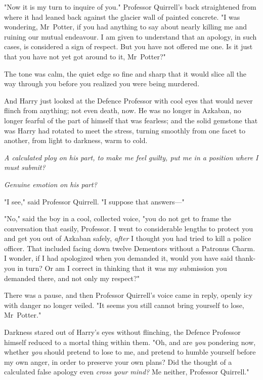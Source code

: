 "Now it is my turn to inquire of you." Professor Quirrell's back straightened
from where it had leaned back against the glacier wall of painted concrete. "I
was wondering, Mr~Potter, if you had anything to say about nearly killing me
and ruining our mutual endeavour. I am given to understand that an apology, in
such cases, is considered a sign of respect. But you have not offered me one.
Is it just that you have not yet got around to it, Mr~Potter?"

The tone was calm, the quiet edge so fine and sharp that it would slice all the
way through you before you realized you were being murdered.

And Harry just looked at the Defence Professor with cool eyes that would never
flinch from anything; not even death, now. He was no longer in Azkaban, no
longer fearful of the part of himself that was fearless; and the solid gemstone
that was Harry had rotated to meet the stress, turning smoothly from one facet
to another, from light to darkness, warm to cold.

\emph{A calculated ploy on his part, to make me feel guilty, put me in a
position where I must submit?}

\emph{Genuine emotion on his part?}

"I see," said Professor Quirrell. "I suppose that answers—"

"No," said the boy in a cool, collected voice, "you do not get to frame the
conversation that easily, Professor. I went to considerable lengths to protect
you and get you out of Azkaban safely, \emph{after} I thought you had tried to
kill a police officer. That included facing down twelve Dementors without a
Patronus Charm. I wonder, if I had apologized when you demanded it, would you
have said thank-you in turn? Or am I correct in thinking that it was my
submission you demanded there, and not only my respect?"

There was a pause, and then Professor Quirrell's voice came in reply, openly
icy with danger no longer veiled. "It seems you still cannot bring yourself to
lose, Mr~Potter."

Darkness stared out of Harry's eyes without flinching, the Defence Professor
himself reduced to a mortal thing within them. "Oh, and are \emph{you}
pondering now, whether \emph{you} should pretend to lose to me, and pretend to
humble yourself before my own anger, in order to preserve your own plans? Did
the thought of a calculated false apology even \emph{cross your mind?} Me
neither, Professor Quirrell."

